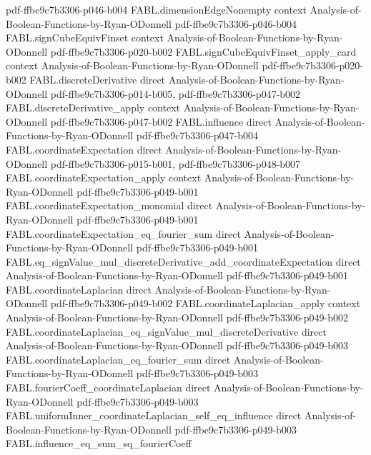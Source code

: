 \begin{theorem}
  {pdf-ffbe9c7b3306-p046-b004}
\proofstep
  {FABL.dimensionEdgeNonempty}
  {context}
  {Analysis-of-Boolean-Functions-by-Ryan-ODonnell}
  {pdf-ffbe9c7b3306-p046-b004}
\proofstep
  {FABL.signCubeEquivFinset}
  {context}
  {Analysis-of-Boolean-Functions-by-Ryan-ODonnell}
  {pdf-ffbe9c7b3306-p020-b002}
\proofstep
  {FABL.signCubeEquivFinset_apply_card}
  {context}
  {Analysis-of-Boolean-Functions-by-Ryan-ODonnell}
  {pdf-ffbe9c7b3306-p020-b002}
\proofstep
  {FABL.discreteDerivative}
  {direct}
  {Analysis-of-Boolean-Functions-by-Ryan-ODonnell}
  {pdf-ffbe9c7b3306-p014-b005,
    pdf-ffbe9c7b3306-p047-b002}
\proofstep
  {FABL.discreteDerivative_apply}
  {context}
  {Analysis-of-Boolean-Functions-by-Ryan-ODonnell}
  {pdf-ffbe9c7b3306-p047-b002}
\proofstep
  {FABL.influence}
  {direct}
  {Analysis-of-Boolean-Functions-by-Ryan-ODonnell}
  {pdf-ffbe9c7b3306-p047-b004}
\proofstep
  {FABL.coordinateExpectation}
  {direct}
  {Analysis-of-Boolean-Functions-by-Ryan-ODonnell}
  {pdf-ffbe9c7b3306-p015-b001,
    pdf-ffbe9c7b3306-p048-b007}
\proofstep
  {FABL.coordinateExpectation_apply}
  {context}
  {Analysis-of-Boolean-Functions-by-Ryan-ODonnell}
  {pdf-ffbe9c7b3306-p049-b001}
\proofstep
  {FABL.coordinateExpectation_monomial}
  {direct}
  {Analysis-of-Boolean-Functions-by-Ryan-ODonnell}
  {pdf-ffbe9c7b3306-p049-b001}
\proofstep
  {FABL.coordinateExpectation_eq_fourier_sum}
  {direct}
  {Analysis-of-Boolean-Functions-by-Ryan-ODonnell}
  {pdf-ffbe9c7b3306-p049-b001}
\proofstep
  {FABL.eq_signValue_mul_discreteDerivative_add_coordinateExpectation}
  {direct}
  {Analysis-of-Boolean-Functions-by-Ryan-ODonnell}
  {pdf-ffbe9c7b3306-p049-b001}
\proofstep
  {FABL.coordinateLaplacian}
  {direct}
  {Analysis-of-Boolean-Functions-by-Ryan-ODonnell}
  {pdf-ffbe9c7b3306-p049-b002}
\proofstep
  {FABL.coordinateLaplacian_apply}
  {context}
  {Analysis-of-Boolean-Functions-by-Ryan-ODonnell}
  {pdf-ffbe9c7b3306-p049-b002}
\proofstep
  {FABL.coordinateLaplacian_eq_signValue_mul_discreteDerivative}
  {direct}
  {Analysis-of-Boolean-Functions-by-Ryan-ODonnell}
  {pdf-ffbe9c7b3306-p049-b003}
\proofstep
  {FABL.coordinateLaplacian_eq_fourier_sum}
  {direct}
  {Analysis-of-Boolean-Functions-by-Ryan-ODonnell}
  {pdf-ffbe9c7b3306-p049-b003}
\proofstep
  {FABL.fourierCoeff_coordinateLaplacian}
  {direct}
  {Analysis-of-Boolean-Functions-by-Ryan-ODonnell}
  {pdf-ffbe9c7b3306-p049-b003}
\proofstep
  {FABL.uniformInner_coordinateLaplacian_self_eq_influence}
  {direct}
  {Analysis-of-Boolean-Functions-by-Ryan-ODonnell}
  {pdf-ffbe9c7b3306-p049-b003}
\proofstep
  {FABL.influence_eq_sum_sq_fourierCoeff}

\end{theorem}
